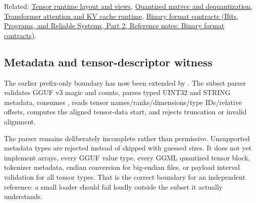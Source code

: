 Related: \hyperref[appendix-cebadf3106d1]{Tensor runtime layout and views}, \hyperref[appendix-241c0e42ac2d]{Quantized matvec and dequantization}, \hyperref[appendix-ea2dadd21ce5]{Transformer attention and KV cache runtime}, \href{../01-Bits-Programs-and-Reliable-Systems-P02/main.pdf\#nameddest=appendix-590bbb2424c1}{Binary format contracts (Bits, Programs, and Reliable Systems, Part 2, Reference notes: Binary format contracts)}.

\subsection{Metadata and tensor-descriptor witness}\label{appendix-fef72dd246f2-metadata-and-tensor-descriptor-witness}

\hypertarget{appendix-fef72dd246f2-metadata-and-tensor-descriptor-witness}{}

The earlier prefix-only boundary has now been extended by . The subset parser validates GGUF v3 magic and counts, parses typed UINT32 and STRING metadata, consumes , reads tensor names/ranks/dimensions/type IDs/relative offsets, computes the aligned tensor-data start, and rejects truncation or invalid alignment.

The parser remains deliberately incomplete rather than permissive. Unsupported metadata types are rejected instead of skipped with guessed sizes. It does not yet implement arrays, every GGUF value type, every GGML quantized tensor block, tokenizer metadata, endian conversion for big-endian files, or payload interval validation for all tensor types. That is the correct boundary for an independent reference: a small loader should fail loudly outside the subset it actually understands.
